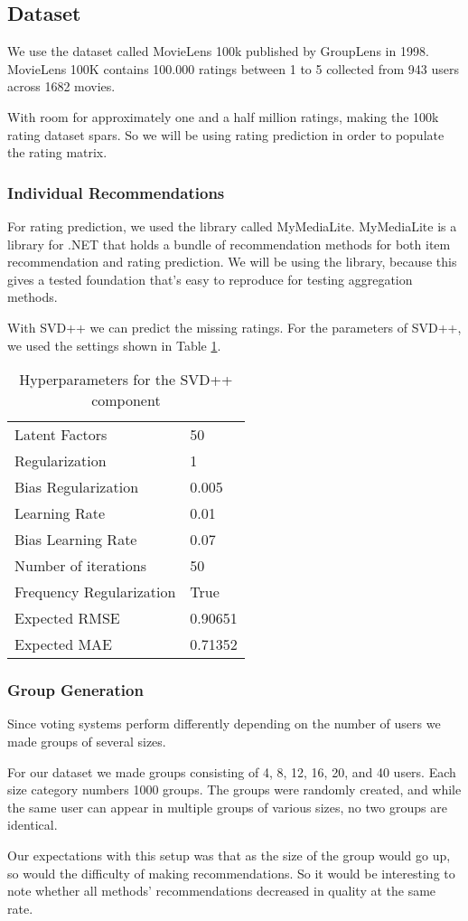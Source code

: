 \subsection{Dataset}\label{sec:dataset}
We use the dataset called MovieLens 100k published by GroupLens in 1998\cite{movielens100k}. MovieLens 100K contains 100.000 ratings between 1 to 5 collected from 943 users across 1682 movies.

With room for approximately one and a half million ratings, making the 100k rating dataset spars. So we will be using rating prediction in order to populate the rating matrix.

\subsubsection{Individual Recommendations}
For rating prediction, we used the library called MyMediaLite\cite{mymedialite}. MyMediaLite is a library for .NET that holds a bundle of recommendation methods for both item recommendation and rating prediction. We will be using the library, because this gives a tested foundation that's easy to reproduce for testing aggregation methods.

With SVD++ we can predict the missing ratings. For the parameters of SVD++, we used the settings shown in Table \ref{tbl:svdpp}.

\begin{table}[H]
	\centering
	\begin{tabular}{|l|l|}\hline
		Latent Factors & 50 \\
		Regularization & 1	\\
		Bias Regularization & 0.005	\\
		Learning Rate & 0.01 \\
		Bias Learning Rate & 0.07 \\ 
		Number of iterations & 50 \\
		Frequency Regularization & True \\ 
		Expected RMSE & 0.90651 \\
		Expected MAE & 0.71352 \\ \hline
	\end{tabular}
	\caption{Hyperparameters for the SVD++ component}
	\label{tbl:svdpp}
\end{table}

\subsubsection{Group Generation}\label{sec:groupgeneration}
Since voting systems perform differently depending on the number of users we made groups of several sizes.

For our dataset we made groups consisting of 4, 8, 12, 16, 20, and 40 users. Each size category numbers 1000 groups. The groups were randomly created, and while the same user can appear in multiple groups of various sizes, no two groups are identical.

Our expectations with this setup was that as the size of the group would go up, so would the difficulty of making recommendations. So it would be interesting to note whether all methods' recommendations decreased in quality at the same rate.